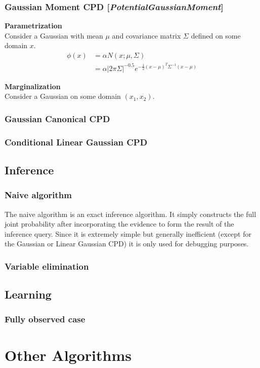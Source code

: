 \documentclass[11pt]{article}
\newcommand{\nllref}[1]{[\small{\textit{#1}}]}
\newcommand{\subsubsubsection}[1]{\noindent\textbf{#1}\\}
\begin{document}
\subsubsection{Gaussian Moment CPD \nllref{PotentialGaussianMoment}}
\subsubsubsection{Parametrization}
Consider a Gaussian with mean $\mu$ and covariance matrix $\Sigma$ defined on some domain $x$.
\begin{align*}
\phi(x) &= \alpha N(x;\mu,\Sigma)\\
&= \alpha |2\pi\Sigma|^{-0.5}e^{-\frac{1}{2}(x-\mu)^T\Sigma^{-1}(x-\mu)}
\end{align*}

\subsubsubsection{Marginalization}
Consider a Gaussian on some domain $(x_1, x_2)$.


\subsubsection{Gaussian Canonical CPD}
\subsubsection{Conditional Linear Gaussian CPD}
\subsection{Inference}
\subsubsection{Naive algorithm}
The naive algorithm is an exact inference algorithm. It simply constructs the full joint probability after incorporating the evidence to form the result of the inference query. Since it is extremely simple but generally inefficient (except for the Gaussian or Linear Gaussian CPD) it is only used for debugging purposes.

\subsubsection{Variable elimination}
\subsection{Learning}
\subsubsection{Fully observed case}

\section{Other Algorithms}
\end{document}

